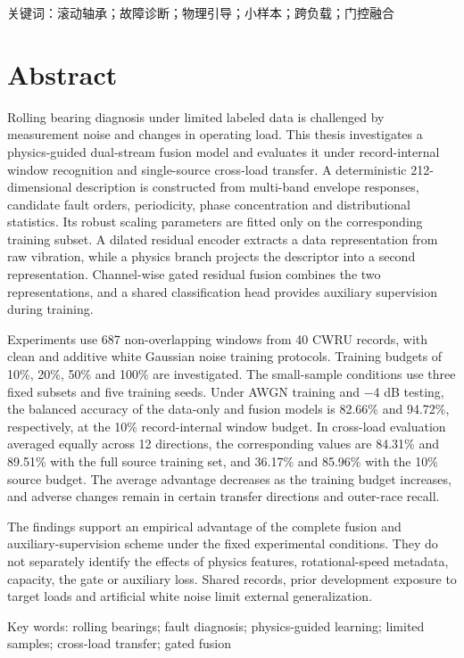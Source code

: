 \documentclass[UTF8,12pt,openany,twoside]{ctexbook}
\numberwithin{equation}{chapter}
\begin{document}
关键词：滚动轴承；故障诊断；物理引导；小样本；跨负载；门控融合

\chapter*{Abstract}

Rolling bearing diagnosis under limited labeled data is challenged by measurement noise and changes in operating load. This thesis investigates a physics-guided dual-stream fusion model and evaluates it under record-internal window recognition and single-source cross-load transfer. A deterministic 212-dimensional description is constructed from multi-band envelope responses, candidate fault orders, periodicity, phase concentration and distributional statistics. Its robust scaling parameters are fitted only on the corresponding training subset. A dilated residual encoder extracts a data representation from raw vibration, while a physics branch projects the descriptor into a second representation. Channel-wise gated residual fusion combines the two representations, and a shared classification head provides auxiliary supervision during training.

Experiments use 687 non-overlapping windows from 40 CWRU records, with clean and additive white Gaussian noise training protocols. Training budgets of 10\%, 20\%, 50\% and 100\% are investigated. The small-sample conditions use three fixed subsets and five training seeds. Under AWGN training and −4 dB testing, the balanced accuracy of the data-only and fusion models is 82.66\% and 94.72\%, respectively, at the 10\% record-internal window budget. In cross-load evaluation averaged equally across 12 directions, the corresponding values are 84.31\% and 89.51\% with the full source training set, and 36.17\% and 85.96\% with the 10\% source budget. The average advantage decreases as the training budget increases, and adverse changes remain in certain transfer directions and outer-race recall.

The findings support an empirical advantage of the complete fusion and auxiliary-supervision scheme under the fixed experimental conditions. They do not separately identify the effects of physics features, rotational-speed metadata, capacity, the gate or auxiliary loss. Shared records, prior development exposure to target loads and artificial white noise limit external generalization.

Key words: rolling bearings; fault diagnosis; physics-guided learning; limited samples; cross-load transfer; gated fusion
\end{document}
